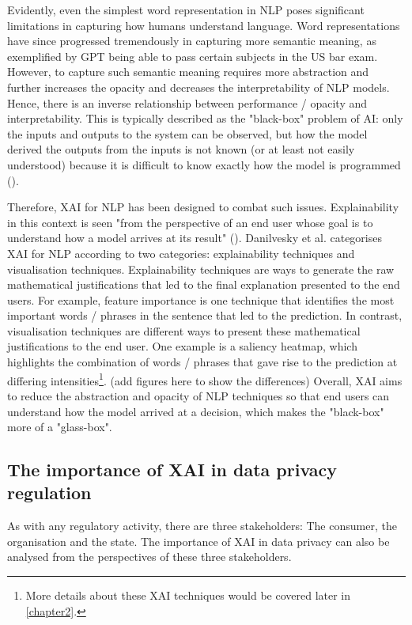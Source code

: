 Evidently, even the simplest word representation in NLP poses significant limitations in capturing how humans understand language. Word representations have since progressed tremendously in capturing more semantic meaning, as exemplified by GPT being able to pass certain subjects in the US bar exam. However, to capture such semantic meaning requires more abstraction and further increases the opacity and decreases the interpretability of NLP models. Hence, there is an inverse relationship between performance / opacity and interpretability.  This is typically described as the "black-box" problem of AI: only the inputs and outputs to the system can be observed, but how the model derived the outputs from the inputs is not known (or at least not easily understood) because it is difficult to know exactly how the model is programmed (\cite{zednik2021}).

Therefore, XAI for NLP has been designed to combat such issues. Explainability in this context is seen "from the perspective of an end user whose goal is to understand how a model arrives at its result" (\cite{danilevsky2020}). Danilvesky et al. categorises XAI for NLP according to two categories: explainability techniques and visualisation techniques. Explainability techniques are ways to generate the raw mathematical justifications that led to the final explanation presented to the end users. For example, feature importance is one technique that identifies the most important words / phrases in the sentence that led to the prediction. In contrast, visualisation techniques are different ways to present these mathematical justifications to the end user. One example is a saliency heatmap, which highlights the combination of words / phrases that gave rise to the prediction at differing intensities\footnote{More details about these XAI techniques would be covered later in \autoref{chapter2}.}. (add figures here to show the differences) Overall, XAI aims to reduce the abstraction and opacity of NLP techniques so that end users can understand how the model arrived at a decision, which makes the "black-box" more of a "glass-box".

\subsection{The importance of XAI in data privacy regulation}
As with any regulatory activity, there are three stakeholders: The consumer, the organisation and the state. The importance of XAI in data privacy can also be analysed from the perspectives of these three stakeholders.

